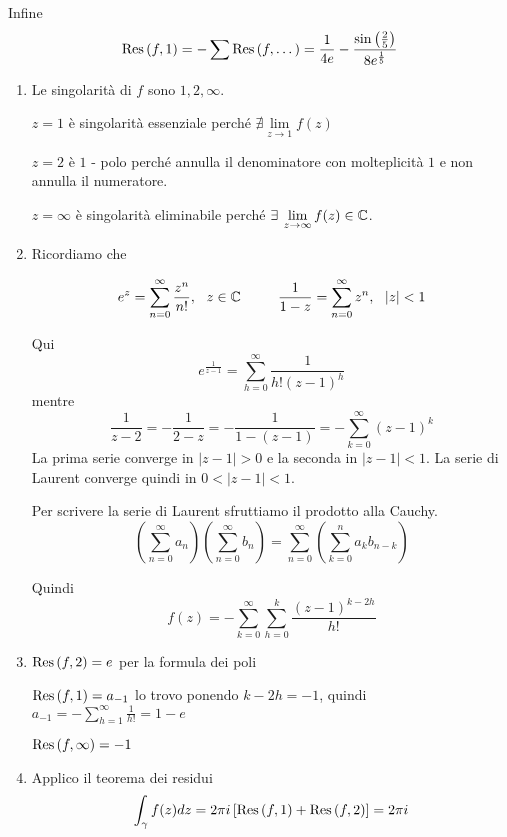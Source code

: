 Infine
\begin{equation*}
\operatorname{Res} \left(f, 1\right) = - \sum \operatorname{Res} \left(f, \dotsc \right) = \frac{1}{4e} - \frac{\sin\left(\frac{2}{5}\right)}{8e^{\frac{1}{5}}}
\end{equation*}
\Soluzione
\begin{enumerate}
\item Le singolarità di $f$ sono $1, 2, \infty $.

$z = 1$ è singolarità essenziale perché $\nexists \lim\limits_{z\rightarrow 1} f(z)$

$z = 2$ è $1$ - polo perché annulla il denominatore con molteplicità $1$ e non annulla il numeratore.

$z = \infty $ è singolarità eliminabile perché $\exists \lim\limits_{z\rightarrow \infty} f(z) \in \CC $.
\item Ricordiamo che

\begin{rem}
\begin{equation*}
e^{z} = \sum\limits^{\infty}_{n = 0}\frac{z^{n}}{n!}, \ \ z\in \mathbb{C} \ \ \ \ \ \ \ \ \frac{1}{1 - z} = \sum\limits^{\infty}_{n = 0} z^{n}, \ \ \left| z\right| < 1
\end{equation*}
\end{rem}

Qui
\begin{equation*}
e^{\frac{1}{z - 1}} = \sum\limits^{\infty}_{h = 0}\frac{1}{h!\left(z - 1\right)^{h}}
\end{equation*}mentre
\begin{equation*}
\frac{1}{z - 2} = - \frac{1}{2 - z} = - \frac{1}{1 - \left(z - 1\right)} = - \sum\limits^{\infty}_{k = 0}\left(z - 1\right)^{k}
\end{equation*}La prima serie converge in $\left| z - 1\right| > 0$ e la seconda in $\left| z - 1\right| < 1$. La serie di Laurent converge quindi in $0 < \left| z - 1\right| < 1$.
\begin{rem}
Per scrivere la serie di Laurent sfruttiamo il prodotto alla Cauchy.
\begin{equation*}
\left(\sum\limits^{\infty}_{n = 0} a_{n}\right)\left(\sum\limits^{\infty}_{n = 0} b_{n}\right) = \sum\limits^{\infty}_{n = 0}\left(\sum\limits^{n}_{k = 0} a_{k} b_{n - k}\right)
\end{equation*}
\end{rem}Quindi
\begin{equation*}
f(z) = - \sum\limits^{\infty}_{k = 0}\sum\limits^{k}_{h = 0}\frac{\left(z - 1\right)^{k - 2h}}{h!}
\end{equation*}
\item $\operatorname{Res} \left(f, 2\right) = e$ per la formula dei poli

$\operatorname{Res} \left(f, 1\right) = a_{- 1}$ lo trovo ponendo $k - 2h = -1$, quindi $a_{- 1} = - \sum\limits^{\infty}_{h = 1}\frac{1}{h!} = 1 - e$

$\operatorname{Res} \left(f, \infty \right) = - 1$
\item Applico il teorema dei residui
\begin{equation*}
\int\nolimits_{\gamma} f(z) dz = 2\pi i\left[\operatorname{Res} \left(f, 1\right) + \operatorname{Res} \left(f, 2\right)\right] = 2\pi i
\end{equation*}
\end{enumerate}
